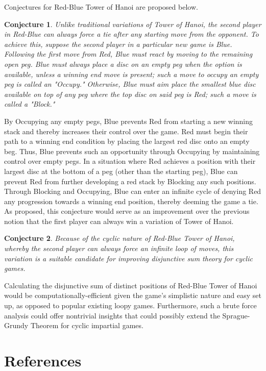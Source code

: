\documentclass[12pt,reqno]{amsart}
\theoremstyle{plain}
\newtheorem{conjecture}{Conjecture}
\begin{document}
Conjectures for Red-Blue Tower of Hanoi are proposed below. 
\begin{conjecture}
Unlike traditional variations of Tower of Hanoi, the second player in Red-Blue can always force a tie after any starting move from the opponent. To achieve this, suppose the second player in a particular new game is Blue. Following the first move from Red, Blue must react by moving to the remaining open peg. Blue must always place a disc on an empty peg when the option is available, unless a winning end move is present; such a move to occupy an empty peg is called an "Occupy." Otherwise, Blue must aim place the smallest blue disc available on top of any peg where the top disc on said peg is Red; such a move is called a "Block."
\end{conjecture}
By Occupying any empty pegs, Blue prevents Red from starting a new winning stack and thereby increases their control over the game. Red must begin their path to a winning end condition by placing the largest red disc onto an empty beg. Thus, Blue prevents such an opportunity through Occupying by maintaining control over empty pegs. In a situation where Red achieves a position with their largest disc at the bottom of a peg (other than the starting peg), Blue can prevent Red from further developing a red stack by Blocking any such positions. Through Blocking and Occupying, Blue can enter an infinite cycle of denying Red any progression towards a winning end position, thereby deeming the game a tie. As proposed, this conjecture would serve as an improvement over the previous notion that the first player can always win a variation of Tower of Hanoi. 

\begin{conjecture}
Because of the cyclic nature of Red-Blue Tower of Hanoi, whereby the second player can always force an infinite loop of moves, this variation is a suitable candidate for improving disjunctive sum theory for cyclic games. 
\end{conjecture}
Calculating the disjunctive sum of distinct positions of Red-Blue Tower of Hanoi would be computationally-efficient given the game's simplistic nature and easy set up, as opposed to popular existing loopy games. Furthermore, such a brute force analysis could offer nontrivial insights that could possibly extend the Sprague-Grundy Theorem for cyclic impartial games.
\section{References}
\newcommand{\makeboxlabel}[1]{\fbox{#1.}\hfill}
\newenvironment{boxlabel}
  {\begin{list}
    {\arabic{boxlblcounter}}
    {\usecounter{boxlblcounter}
     \setlength{\labelwidth}{3em}
     \setlength{\labelsep}{0em}
     \setlength{\itemsep}{2pt}
     \setlength{\leftmargin}{1.5cm}
     \setlength{\rightmargin}{2cm}
     \setlength{\itemindent}{0em} 
     \let\makelabel=\makeboxlabel
    }
  }
{\end{list}}
\end{document}
